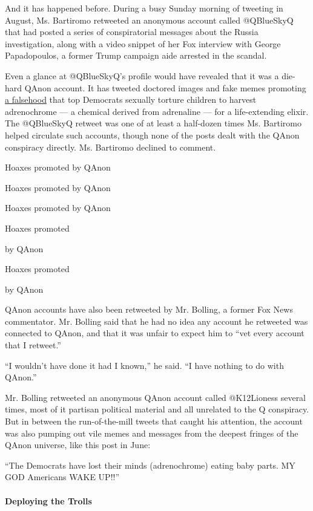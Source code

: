 And it has happened before. During a busy Sunday morning of tweeting in
August, Ms. Bartiromo retweeted an anonymous account called @QBlueSkyQ
that had posted a series of conspiratorial messages about the Russia
investigation, along with a video snippet of her Fox interview with
George Papadopoulos, a former Trump campaign aide arrested in the
scandal.

Even a glance at @QBlueSkyQ's profile would have revealed that it was a
die-hard QAnon account. It has tweeted doctored images and fake memes
promoting
\href{https://theoutline.com/post/7621/slender-man-for-boomers-andrenochrome-qanon?zd=2\&zi=oxrjefai}{a
falsehood} that top Democrats sexually torture children to harvest
adrenochrome --- a chemical derived from adrenaline --- for a
life-extending elixir. The @QBlueSkyQ retweet was one of at least a
half-dozen times Ms. Bartiromo helped circulate such accounts, though
none of the posts dealt with the QAnon conspiracy directly. Ms.
Bartiromo declined to comment.

Hoaxes promoted by QAnon

Hoaxes promoted by QAnon

Hoaxes promoted by QAnon

Hoaxes promoted

by QAnon

Hoaxes promoted

by QAnon

QAnon accounts have also been retweeted by Mr. Bolling, a former Fox
News commentator. Mr. Bolling said that he had no idea any account he
retweeted was connected to QAnon, and that it was unfair to expect him
to ``vet every account that I retweet.''

``I wouldn't have done it had I known,'' he said. ``I have nothing to do
with QAnon.''

Mr. Bolling retweeted an anonymous QAnon account called @K12Lioness
several times, most of it partisan political material and all unrelated
to the Q conspiracy. But in between the run-of-the-mill tweets that
caught his attention, the account was also pumping out vile memes and
messages from the deepest fringes of the QAnon universe, like this post
in June:

``The Democrats have lost their minds (adrenochrome) eating baby parts.
MY GOD Americans WAKE UP!!''

\hypertarget{deploying-the-trolls}{%
\paragraph{Deploying the Trolls}\label{deploying-the-trolls}}

